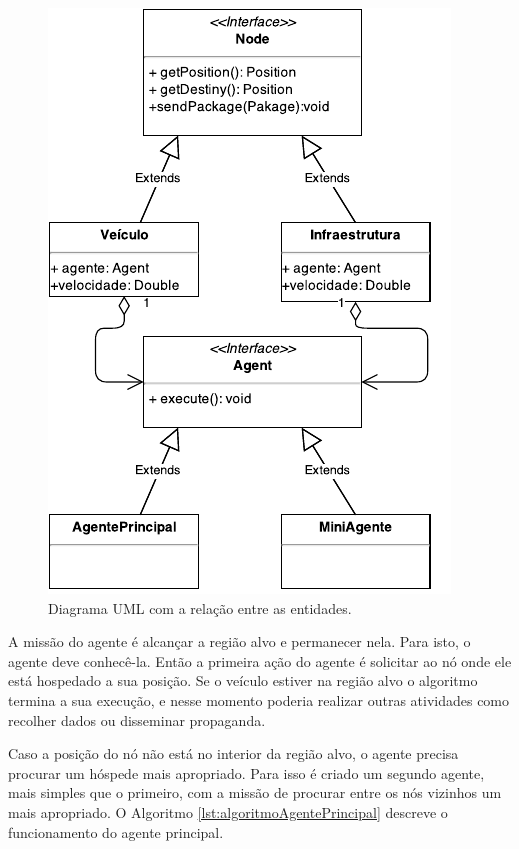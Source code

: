\begin{figure}[htbp]
	\centering
	\includegraphics[scale=0.8]{metodologia/figuras/umlAtores.pdf}
	\caption{Diagrama UML com a relação entre as entidades.}
	\label{fig:umlAtores}
\end{figure}

A missão do agente é alcançar a região alvo e permanecer nela. Para isto, o agente deve conhecê-la. Então a primeira ação do agente é solicitar ao nó onde ele está hospedado a sua posição. Se o veículo estiver na região alvo o algoritmo termina a sua execução, e nesse momento poderia realizar outras atividades como recolher dados ou disseminar propaganda.

Caso a posição do nó não está no interior da região alvo, o agente precisa procurar um hóspede mais apropriado. Para isso é criado um segundo agente, mais simples que o primeiro, com a missão de procurar entre os nós vizinhos um mais apropriado. O Algoritmo \ref{lst:algoritmoAgentePrincipal} descreve o funcionamento do agente principal.

